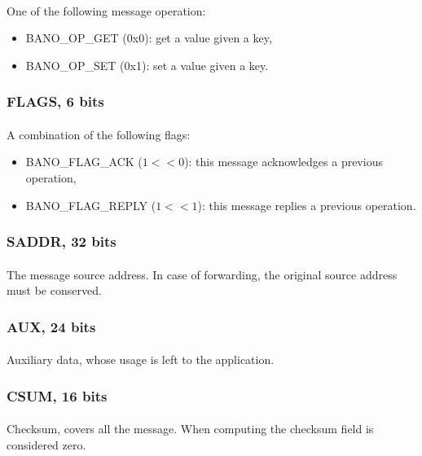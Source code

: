 \documentclass[a4paper, 11pt]{article}
\begin{document}
\paragraph{}
One of the following message operation:
\begin{itemize}
\item BANO\_OP\_GET (0x0): get a value given a key,
\item BANO\_OP\_SET (0x1): set a value given a key.
\end{itemize}

\subsubsection{FLAGS, 6 bits}
\paragraph{}
A combination of the following flags:
\begin{itemize}
\item BANO\_FLAG\_ACK ($1<<0$): this message acknowledges a previous
operation,
\item BANO\_FLAG\_REPLY ($1<<1$): this message replies a previous
operation.
\end{itemize}

\subsubsection{SADDR, 32 bits}
\paragraph{}
The message source address. In case of forwarding, the original source
address must be conserved.

\subsubsection{AUX, 24 bits}
\paragraph{}
Auxiliary data, whose usage is left to the application.

\subsubsection{CSUM, 16 bits}
\paragraph{}
Checksum, covers all the message. When computing the checksum field 
is considered zero.
\end{document}
